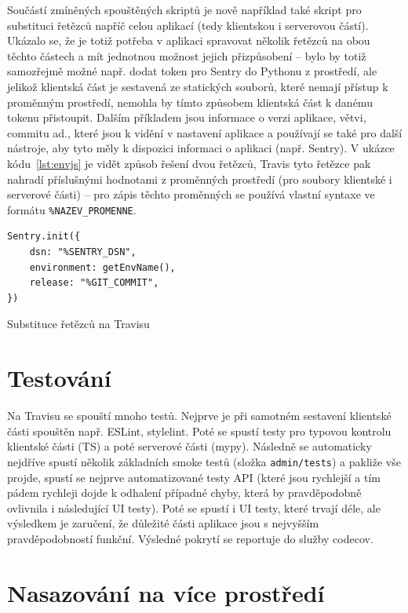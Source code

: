 Součástí zmíněných spouštěných skriptů je nově například také skript pro substituci řetězců napříč celou aplikací (tedy klientskou i serverovou částí). Ukázalo se, že je totiž potřeba v aplikaci spravovat několik řetězců na obou těchto částech a mít jednotnou možnost jejich přizpůsobení -- bylo by totiž samozřejmě možné např. dodat token pro Sentry do Pythonu z prostředí, ale jelikož klientská část je sestavená ze statických souborů, které nemají přístup k proměnným prostředí, nemohla by tímto způsobem klientská část k danému tokenu přistoupit. Dalším příkladem jsou informace o verzi aplikace, větvi, commitu ad., které jsou k vidění v nastavení aplikace a používají se také pro další nástroje, aby tyto měly k dispozici informaci o aplikaci (např. Sentry). V ukázce kódu~\ref{lst:envjs} je vidět způsob řešení dvou řetězců, Travis tyto řetězce pak nahradí příslušnými hodnotami z proměnných prostředí (pro soubory klientské i serverové části) -- pro zápis těchto proměnných se používá vlastní syntaxe ve formátu \verb|%NAZEV_PROMENNE|.

\begin{listing}[ht]
	\begin{verbatim}
Sentry.init({
    dsn: "%SENTRY_DSN",
    environment: getEnvName(),
    release: "%GIT_COMMIT",
})
	\end{verbatim}
	\caption{Substituce řetězců na Travisu}\label{lst:envjs}
\end{listing}

\section{Testování}

Na Travisu se spouští mnoho testů. Nejprve je při samotném sestavení klientské části spouštěn např. ESLint, stylelint. Poté se spustí testy pro typovou kontrolu klientské části (TS) a poté serverové části (mypy). Následně se automaticky nejdříve spustí několik základních smoke testů (složka \verb|admin/tests|) a pakliže vše projde, spustí se nejprve automatizované testy API (které jsou rychlejší a tím pádem rychleji dojde k odhalení případné chyby, která by pravděpodobně ovlivnila i následující UI testy). Poté se spustí i UI testy, které trvají déle, ale výsledkem je zaručení, že důležité části aplikace jsou s nejvyšším pravděpodobností funkční. Výsledné pokrytí se reportuje do služby codecov.

\section{Nasazování na více prostředí}\label{sec:nasazovani-nasazovaninaviceprostredi}

